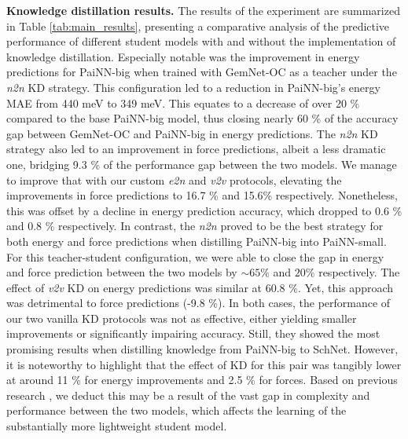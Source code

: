 \documentclass{article}
\begin{document}
\textbf{Knowledge distillation results.} 
The results of the experiment are summarized in Table \ref{tab:main_results}, presenting a comparative analysis of the predictive performance of different student models with and without the implementation of knowledge distillation.
% 
Especially notable was the improvement in energy predictions for PaiNN-big when trained with GemNet-OC as a teacher under the \emph{n2n} KD strategy. This configuration led to a reduction in PaiNN-big's energy MAE from 440 \si{\milli\electronvolt} to 349 \si{\milli\electronvolt}. This equates to a decrease of over 20 \% compared to the base PaiNN-big model, thus closing nearly 60 \% of the accuracy gap between GemNet-OC and PaiNN-big in energy predictions. The \emph{n2n} KD strategy also led to an improvement in force predictions, albeit a less dramatic one, bridging 9.3 \% of the performance gap between the two models. We manage to improve that with our custom \emph{e2n} and \emph{v2v} protocols, elevating the improvements in force predictions to 16.7 \% and 15.6\% respectively. Nonetheless, this was offset by a decline in energy prediction accuracy, which dropped to 0.6 \% and 0.8 \% respectively. 
% 
In contrast, the \emph{n2n} proved to be the best strategy for both energy and force predictions when distilling PaiNN-big into PaiNN-small. For this teacher-student configuration, we were able to close the gap in energy and force prediction between the two models by ${\sim}65\%$ and $20\%$ respectively. The effect of \emph{v2v} KD on energy predictions was similar at 60.8 \%. Yet, this approach was detrimental to force predictions (-9.8 \%).
% 
In both cases, the performance of our two vanilla KD protocols was not as effective, either yielding smaller improvements or significantly impairing accuracy. Still, they showed the most promising results when distilling knowledge from PaiNN-big to SchNet. However, it is noteworthy to highlight that the effect of KD for this pair was tangibly lower at around 11 \% for energy improvements and 2.5 \% for forces. Based on previous research \cite{cho2019efficacy}, we deduct this may be a result of the vast gap in complexity and performance between the two models, which affects the learning of the substantially more lightweight student model.
 
\end{document}
